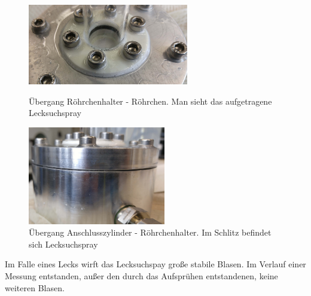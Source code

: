 \begin{figure}[h!]
		\begin{minipage}[hbt]{7cm}
			\centering
			\includegraphics[width=7cm]{Leck1_vorher.jpg}
			\caption[Leck Röhrchenansatz vorher]{Übergang Röhrchenhalter - Röhrchen. Man sieht das aufgetragene Lecksuchspray}
		\end{minipage}
		\hfill
		\begin{minipage}[hbt]{6cm}
			\centering
			\includegraphics[width=6cm]{Leck2_vorher.jpg}
			\caption[Leck Anschlusszylinder vorher]{Übergang Anschlusszylinder - Röhrchenhalter. Im Schlitz befindet sich Lecksuchspray}
		\end{minipage}
\end{figure}

Im Falle eines Lecks wirft das Lecksuchspay große stabile Blasen. Im Verlauf einer Messung entstanden, außer den durch das Aufsprühen entstandenen, keine weiteren Blasen.


